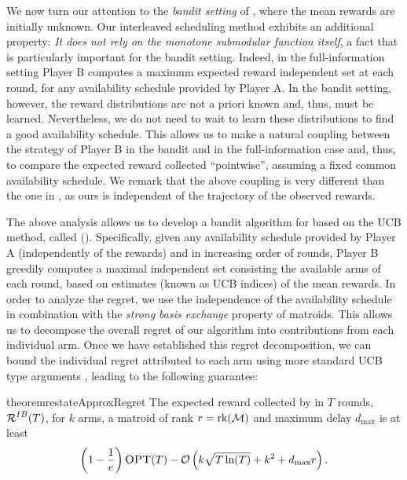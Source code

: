 We now turn our attention to the {\em bandit setting} of \mbb, where the mean rewards are initially unknown. Our interleaved scheduling method exhibits an additional property: {\em It does not rely on the monotone submodular function itself}, a fact that is particularly important for the bandit setting. Indeed, in the full-information setting Player B computes a maximum expected reward independent set at each round, for any availability schedule provided by Player A. In the bandit setting, however, the reward distributions are not a priori known and, thus, must be learned. Nevertheless, we do not need to wait to learn these distributions to find a good availability schedule. This allows us to make a natural coupling between the strategy of Player B in the bandit and in the full-information case and, thus, to compare the expected reward collected ``pointwise'', assuming a fixed common availability schedule. We remark that the above coupling is very different than the one in \cite{BSSS19}, as ours is independent of the trajectory of the observed rewards.

The above analysis allows us to develop a bandit algorithm for \mbb based on the UCB method, called \ucb (\UCB). Specifically, given any availability schedule provided by Player A (independently of the rewards) and in increasing order of rounds, Player B greedily computes a maximal independent set consisting the available arms of each round, based on estimates (known as UCB indices) of the mean rewards. In order to analyze the regret, we use the independence of the availability schedule in combination with the {\em strong basis exchange} property of matroids. This allows us to decompose the overall regret of our algorithm into contributions from each individual arm. Once we have established this regret decomposition, we can bound the individual regret attributed to each arm using more standard UCB type arguments \cite{KWAEE14}, leading to the following guarantee: 

\begin{restatable}{theorem}{restateApproxRegret}\label{thm:approxregret}
The expected reward collected by \ucb in $T$ rounds, $\operatorname{\mathcal{R}}^{IB}(T)$, for $k$ arms, a matroid of rank $r = \operatorname{rk}(\operatorname{\mathcal{M}})$ and maximum delay $d_{\max}$ is at least
\begin{align*}
    \left(1-\frac{1}{e}\right)\textsc{OPT}(T) - \mathcal{O}\left(k \sqrt{T \ln(T)} + k^2 + d_{\max}r \right).
\end{align*}
\end{restatable}

